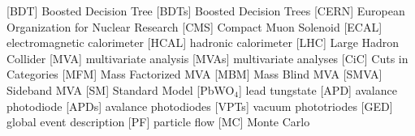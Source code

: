 \begin{acronym}[AAAAAA]
 [BDT] {Boosted Decision Tree}
 [BDTs] {Boosted Decision Trees}
 [CERN] {European Organization for Nuclear Research}
 [CMS] {Compact Muon Solenoid}
 [ECAL] {electromagnetic calorimeter}
 [HCAL] {hadronic calorimeter}
 [LHC] {Large Hadron Collider}
 [MVA] {multivariate analysis}
 [MVAs] {multivariate analyses}
 [CiC] {Cuts in Categories}
 [MFM] {Mass Factorized MVA}
 [MBM] {Mass Blind MVA}
 [SMVA] {Sideband MVA}
 [SM] {Standard Model}
 [PbWO$_{4}$] {lead tungstate}
 [APD] {avalance photodiode}
 [APDs] {avalance photodiodes}
 [VPTs] {vacuum phototriodes}
 [GED] {global event description}
 [PF] {particle flow}
 [MC] {Monte Carlo}
\end{acronym}



